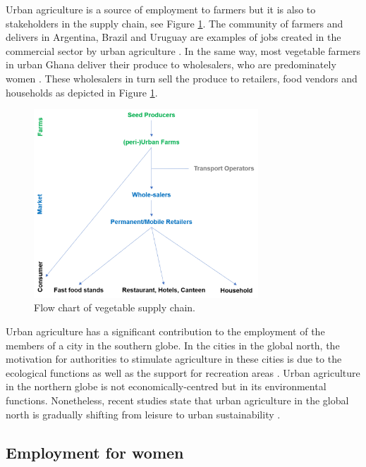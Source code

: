 Urban agriculture is a source of employment to farmers but it is also to stakeholders in the supply chain, see Figure \ref{fig:vegySupplyChain}. The community of farmers and delivers in Argentina, Brazil and Uruguay are examples of jobs created in the commercial sector by urban agriculture \cite{InternationalLabourOrganization2006}. In the same way, most vegetable farmers in urban Ghana deliver their produce to wholesalers, who are predominately women \cite{Amponsah2016a, Amoah2007}. These wholesalers in turn sell the produce to retailers, food vendors and households as depicted in Figure \ref{fig:vegySupplyChain}.

\begin{figure}[th]
\centering
\includegraphics[width=0.75\textwidth]{./Figures/vegySupplyChain.png}
\decoRule
\caption[Flow chart of vegetable supply chain]{Flow chart of vegetable supply chain. \cite{Drechsel2014}}
\label{fig:vegySupplyChain}
\end{figure}

Urban agriculture has a significant contribution to the employment of the members of a city in the southern globe. In the cities in the global north, the motivation for authorities to stimulate agriculture in these cities is due to the ecological functions as well as the support for recreation areas \cite{Pearson2010}. Urban agriculture in the northern globe is not economically-centred but in its environmental functions. Nonetheless, recent studies state that urban agriculture in the global north is gradually shifting from leisure to urban sustainability \cite{McClintock2010}.

\subsection{Employment for women}

